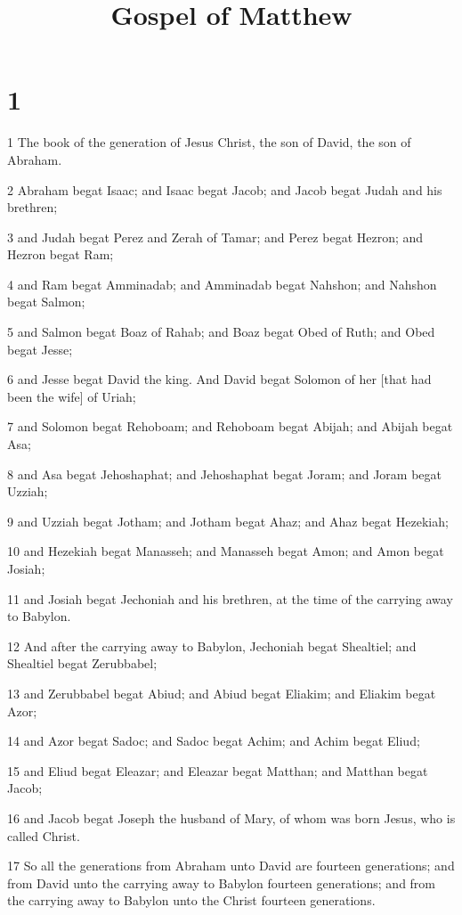 

\title{Gospel of Matthew}

\chapter{1}

\par 1 The book of the generation of Jesus Christ, the son of David, the son of Abraham.
\par 2 Abraham begat Isaac; and Isaac begat Jacob; and Jacob begat Judah and his brethren;
\par 3 and Judah begat Perez and Zerah of Tamar; and Perez begat Hezron; and Hezron begat Ram;
\par 4 and Ram begat Amminadab; and Amminadab begat Nahshon; and Nahshon begat Salmon;
\par 5 and Salmon begat Boaz of Rahab; and Boaz begat Obed of Ruth; and Obed begat Jesse;
\par 6 and Jesse begat David the king. And David begat Solomon of her [that had been the wife] of Uriah;
\par 7 and Solomon begat Rehoboam; and Rehoboam begat Abijah; and Abijah begat Asa;
\par 8 and Asa begat Jehoshaphat; and Jehoshaphat begat Joram; and Joram begat Uzziah;
\par 9 and Uzziah begat Jotham; and Jotham begat Ahaz; and Ahaz begat Hezekiah;
\par 10 and Hezekiah begat Manasseh; and Manasseh begat Amon; and Amon begat Josiah;
\par 11 and Josiah begat Jechoniah and his brethren, at the time of the carrying away to Babylon.
\par 12 And after the carrying away to Babylon, Jechoniah begat Shealtiel; and Shealtiel begat Zerubbabel;
\par 13 and Zerubbabel begat Abiud; and Abiud begat Eliakim; and Eliakim begat Azor;
\par 14 and Azor begat Sadoc; and Sadoc begat Achim; and Achim begat Eliud;
\par 15 and Eliud begat Eleazar; and Eleazar begat Matthan; and Matthan begat Jacob;
\par 16 and Jacob begat Joseph the husband of Mary, of whom was born Jesus, who is called Christ.
\par 17 So all the generations from Abraham unto David are fourteen generations; and from David unto the carrying away to Babylon fourteen generations; and from the carrying away to Babylon unto the Christ fourteen generations.
